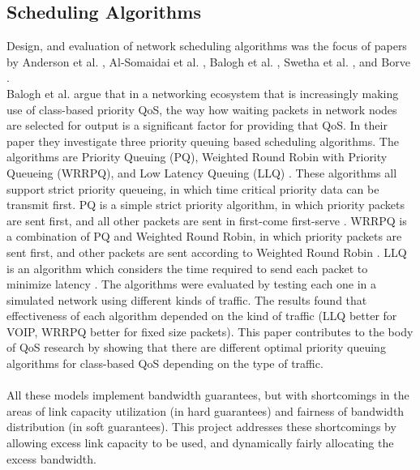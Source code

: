 \documentclass[accepted,single]{gipaper}
\begin{document}
\subsection{Scheduling Algorithms}
\label{algs}

Design, and evaluation of network scheduling algorithms was the focus of papers by Anderson et al. \cite{Anderson2004FairSO}, Al-Somaidai et al. \cite{Basheer}, Balogh et al. \cite{Balogh}, Swetha et al. \cite{Swetha}, and Borve \cite{Brve2009PacketSA}.
\\


\hspace{10mm} Balogh et al. \cite{Balogh} argue that in a networking ecosystem that is increasingly making use of class-based priority QoS, the way how waiting packets in network nodes are selected for output is a significant factor for providing that QoS. In their paper they investigate three priority queuing based scheduling algorithms. The algorithms are Priority Queuing (PQ), Weighted Round Robin with Priority Queueing (WRRPQ), and Low Latency Queuing (LLQ) \cite{Balogh}. These algorithms all support strict priority queueing, in which time critical priority data can be transmit first. PQ is a simple strict priority algorithm, in which priority packets are sent first, and all other packets are sent in first-come first-serve \cite{Balogh}. WRRPQ is a combination of PQ and Weighted Round Robin, in which priority packets are sent first, and other packets are sent according to Weighted Round Robin \cite{Balogh}. LLQ is an algorithm which considers the time required to send each packet to minimize latency \cite{Balogh}. The algorithms were evaluated by testing each one in a simulated network using different kinds of traffic. The results found that effectiveness of each algorithm depended on the kind of traffic (LLQ better for VOIP, WRRPQ better for fixed size packets). This paper contributes to the body of QoS research by showing that there are different optimal priority queuing algorithms for class-based QoS depending on the type of traffic.
\\\\


\label{prev_work_conclusion}
All these models implement bandwidth guarantees, but with shortcomings in the areas of link capacity utilization (in hard guarantees) and fairness of bandwidth distribution (in soft guarantees). This project addresses these shortcomings by allowing excess link capacity to be used, and dynamically fairly allocating the excess bandwidth.
\end{document}
